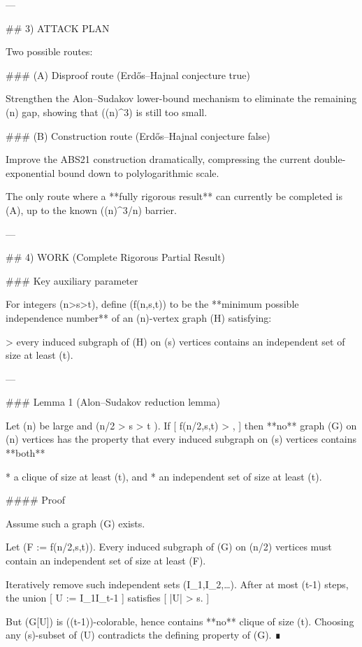 ---

## 3) ATTACK PLAN

Two possible routes:

### (A) Disproof route (Erdős–Hajnal conjecture true)

Strengthen the Alon–Sudakov lower-bound mechanism to eliminate the remaining (\log\log n) gap, showing that ((\log n)^3) is still too small.

### (B) Construction route (Erdős–Hajnal conjecture false)

Improve the ABS21 construction dramatically, compressing the current double-exponential bound down to polylogarithmic scale.

The only route where a **fully rigorous result** can currently be completed is (A), up to the known ((\log n)^3/\log\log n) barrier.

---

## 4) WORK (Complete Rigorous Partial Result)

### Key auxiliary parameter

For integers (n>s>t), define (f(n,s,t)) to be the **minimum possible independence number** of an (n)-vertex graph (H) satisfying:

> every induced subgraph of (H) on (s) vertices contains an independent set of size at least (t).

---

### Lemma 1 (Alon–Sudakov reduction lemma)

Let (n) be large and (n/2 > s > t ).
If
[
f(\lfloor n/2\rfloor,s,t) > ,
]
then **no** graph (G) on (n) vertices has the property that every induced subgraph on (s) vertices contains **both**

* a clique of size at least (t), and
* an independent set of size at least (t).

#### Proof

Assume such a graph (G) exists.

Let (F := f(\lfloor n/2\rfloor,s,t)).
Every induced subgraph of (G) on (\lfloor n/2\rfloor) vertices must contain an independent set of size at least (F).

Iteratively remove such independent sets (I_1,I_2,\dots).
After at most (t-1) steps, the union
[
U := I_1\cup\cdots\cup I_{t-1}
]
satisfies
[
|U| \ge {} > s.
]

But (G[U]) is ((t-1))-colorable, hence contains **no** clique of size (t).
Choosing any (s)-subset of (U) contradicts the defining property of (G). ∎

